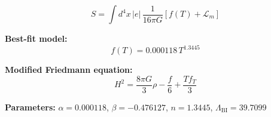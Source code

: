 
\begin{equation}
  S = \int d^4x \, |e| \, \frac{1}{16\pi G} \left[ f(T) + \mathcal{L}_m \right]
\end{equation}

\textbf{Best-fit model:}
\begin{equation}
  f(T) = 0.000118 \, T^{1.3445}
\end{equation}

\textbf{Modified Friedmann equation:}
\begin{equation}
  H^2 = \frac{8\pi G}{3} \rho - \frac{f}{6} + \frac{T f_T}{3}
\end{equation}

\textbf{Parameters:}
$\alpha = 0.000118$, \quad
$\beta = -0.476127$, \quad
$n = 1.3445$, \quad
$\Lambda_{\text{BI}} = 39.7099$